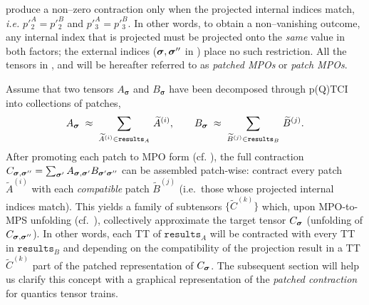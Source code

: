 produce a non--zero contraction only when the projected internal indices match, \textit{i.e.} $p'^{A}_{2}=p'^{B}_{2}$ and $p'^{A}_{3}=p'^{B}_{3}$.  In other words, to obtain a non--vanishing outcome, any internal index that is projected must be projected onto the \emph{same} value in both factors; the external indices ($\boldsymbol{\sigma},\boldsymbol{\sigma}''$ in ) place no such restriction. All the tensors in ,  and  will be hereafter referred to as \textit{patched MPOs} or \textit{patch MPOs}.

Assume that two tensors \(A_{\boldsymbol{\sigma}}\) and
\(B_{\boldsymbol{\sigma}}\) have been decomposed through p(Q)TCI into collections of
patches,
\begin{equation}
    \label{eq:patchCollectionsContr}
  A_{\boldsymbol{\sigma}}
    \;\approx\;
    \sum_{\widetilde{A}^{(i)}\in\texttt{results}_{A}}\,
        \widetilde{A}^{(i)},
  \qquad
  B_{\boldsymbol{\sigma}}
    \;\approx\;
    \sum_{\widetilde{B}^{(j)}\in\texttt{results}_{B}}\,
        \widetilde{B}^{(j)}.
\end{equation}
After promoting each patch to MPO form (cf. ), the full contraction \(C_{\boldsymbol{\sigma},\boldsymbol{\sigma}''} = \sum_{\boldsymbol{\sigma}'}A_{\boldsymbol{\sigma},\boldsymbol{\sigma}'}B_{\boldsymbol{\sigma}'\boldsymbol{\sigma}''}\) can be assembled patch-wise:
contract every patch \(\widetilde{A}^{(i)}\) with each \emph{compatible} patch \(\widetilde{B}^{(j)}\) (i.e.\ those whose projected internal indices match).  This yields a family of subtensors \(\{\widetilde{C}^{(k)}\}\) which, upon MPO-to-MPS unfolding (cf.\ ), collectively approximate the target tensor \(C_{\boldsymbol{\sigma}}\) (unfolding of $C_{\boldsymbol{\sigma},\boldsymbol{\sigma}''}$). In other words, each TT of $\texttt{results}_{A}$ will be contracted with every TT in $\texttt{results}_{B}$ and depending on the compatibility of the projection result in a TT $\widetilde{C}^{(k)}$ part of the patched representation of \(C_{\boldsymbol{\sigma}}\). The subsequent section will help us clarify this concept with a graphical representation of the \textit{patched contraction} for quantics tensor trains.

